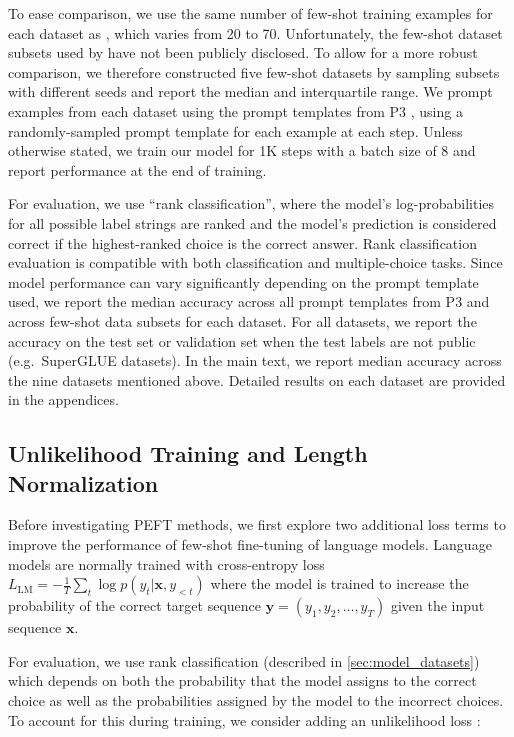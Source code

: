 To ease comparison, we use the same number of few-shot training examples for each dataset as \citet{brown2020language}, which varies from 20 to 70. Unfortunately, the few-shot dataset subsets used by \citet{brown2020language} have not been publicly disclosed. To allow for a more robust comparison, we therefore constructed five few-shot datasets by sampling subsets with different seeds and report the median and interquartile range. We prompt examples from each dataset using the prompt templates from P3 \citet{bach2022promptsource}, using a randomly-sampled prompt template for each example at each step. Unless otherwise stated, we train our model for 1K steps with a batch size of 8 and report performance at the end of training.

For evaluation, we use ``rank classification'', where the model's log-probabilities for all possible label strings are ranked and the model's prediction is considered correct if the highest-ranked choice is the correct answer. Rank classification evaluation is compatible with both classification and multiple-choice tasks. Since model performance can vary significantly depending on the prompt template used, we report the median accuracy across all prompt templates from P3 and across few-shot data subsets for each dataset. For all datasets, we report the accuracy on the test set or validation set when the test labels are not public (e.g.\ SuperGLUE datasets). In the main text, we report median accuracy across the nine datasets mentioned above. Detailed results on each dataset are provided in the appendices.

\subsection{Unlikelihood Training and Length Normalization}
\label{sec:ul_ln}

Before investigating PEFT methods, we first explore two additional loss terms to improve the performance of few-shot fine-tuning of language models. Language models are normally trained with cross-entropy loss $L_{\mathrm{LM}} = - \frac{1}{T} \sum_t \log p(y_t|\mathbf{x}, y_{<t})$ where the model is trained to increase the probability of the correct target sequence $\mathbf{y} = (y_1, y_2, \dots, y_T)$ given the input sequence $\mathbf{x}$. 

For evaluation, we use rank classification (described in \ref{sec:model_datasets}) which depends on both the probability that the model assigns to the correct choice as well as the probabilities assigned by the model to the incorrect choices. To account for this during training, we consider adding an unlikelihood loss \cite{tam2021improving,welleck2019neural}:

